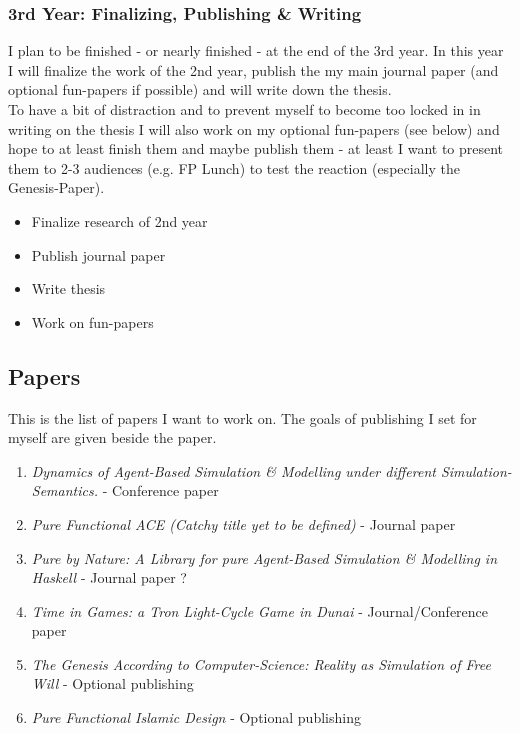 \subsubsection{3rd Year: Finalizing, Publishing \& Writing}
I plan to be finished - or nearly finished - at the end of the 3rd year. In this year I will finalize the work of the 2nd year, publish the my main journal paper (and optional fun-papers if possible) and will write down the thesis. \\ To have a bit of distraction and to prevent myself to become too locked in in writing on the thesis I will also work on my optional fun-papers (see below) and hope to at least finish them and maybe publish them - at least I want to present them to 2-3 audiences (e.g. FP Lunch) to test the reaction (especially the Genesis-Paper).

\begin{itemize}
\item Finalize research of 2nd year
\item Publish journal paper
\item Write thesis
\item Work on fun-papers
\end{itemize}

\subsection{Papers}
This is the list of papers I want to work on. The goals of publishing I set for myself are given beside the paper.

\begin{enumerate}
\item \textit{Dynamics of Agent-Based Simulation \& Modelling under different Simulation-Semantics.} - Conference paper
\item \textit{Pure Functional ACE (Catchy title yet to be defined)} - Journal paper
\item \textit{Pure by Nature: A Library for pure Agent-Based Simulation \& Modelling in Haskell} - Journal paper ?
\item \textit{Time in Games: a Tron Light-Cycle Game in Dunai} - Journal/Conference paper
\item \textit{The Genesis According to Computer-Science: Reality as Simulation of Free Will} - Optional publishing
\item \textit{Pure Functional Islamic Design} - Optional publishing
\end{enumerate}


